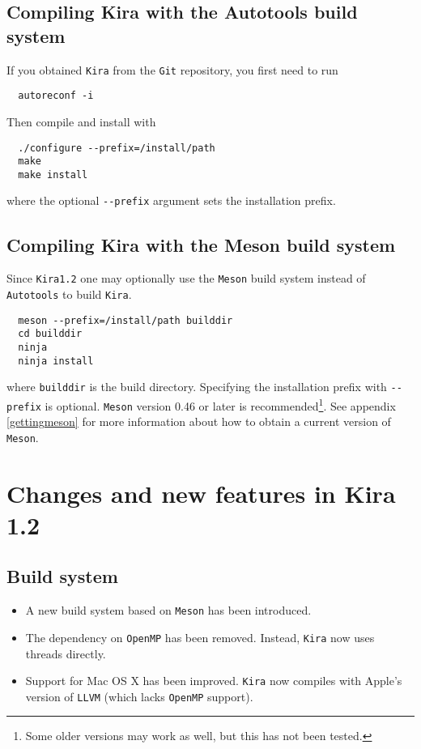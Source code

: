 \documentclass[a4paper,12pt]{article}
\newcommand*{\kira}{\texttt{Kira}}
\newcommand*{\git}{\texttt{Git}}
\begin{document}
\subsection{Compiling Kira with the Autotools build system}
\label{installwithautotools}

If you obtained \kira{} from the \git{} repository, you first need
to run
%
\begin{verbatim}
  autoreconf -i
\end{verbatim}
%
Then compile and install with
\begin{verbatim}
  ./configure --prefix=/install/path
  make
  make install
\end{verbatim}
%
where the optional \texttt{-{}-prefix} argument sets the installation prefix.


\subsection{Compiling Kira with the Meson build system}

Since \kira{}\;\texttt{1.2} one may optionally use the \texttt{Meson} build
system instead of \texttt{Autotools} to build \kira{}.
%
\begin{verbatim}
  meson --prefix=/install/path builddir
  cd builddir
  ninja
  ninja install
\end{verbatim}
%
where \texttt{builddir} is the build directory.
Specifying the installation prefix with \texttt{-{}-prefix} is optional.
\texttt{Meson} version 0.46 or later is recommended\footnote{Some older versions
may work as well, but this has not been tested.}.
See appendix \ref{gettingmeson} for more information about how to obtain a
current version of \texttt{Meson}.


\section{Changes and new features in Kira 1.2}
\label{sect:news}

\subsection{Build system}

\begin{itemize}
  \item A new build system based on \texttt{Meson} has been introduced.
  \item The dependency on \texttt{OpenMP} has been removed.
        Instead, \kira{} now uses threads directly.
  \item Support for Mac OS X has been improved. \kira{} now compiles with
        Apple's version of \texttt{LLVM} (which lacks \texttt{OpenMP} support).
\end{itemize}
\end{document}
